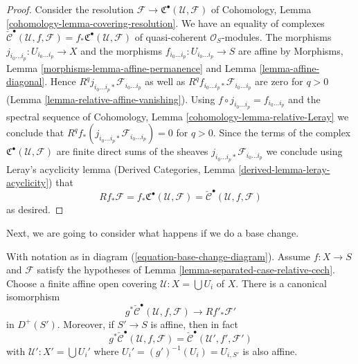 \begin{proof}
Consider the resolution
$\mathcal{F} \to {\mathfrak C}^\bullet(\mathcal{U}, \mathcal{F})$
of Cohomology, Lemma \ref{cohomology-lemma-covering-resolution}.
We have an equality of complexes
$\check{\mathcal{C}}^\bullet(\mathcal{U}, f, \mathcal{F}) =
f_*{\mathfrak C}^\bullet(\mathcal{U}, \mathcal{F})$
of quasi-coherent $\mathcal{O}_S$-modules.
The morphisms $j_{i_0 \ldots i_p} : U_{i_0 \ldots i_p} \to X$
and the morphisms $f_{i_0 \ldots i_p} : U_{i_0 \ldots i_p} \to S$
are affine by Morphisms, Lemma \ref{morphisms-lemma-affine-permanence}
and Lemma \ref{lemma-affine-diagonal}.
Hence $R^qj_{i_0 \ldots i_p *}\mathcal{F}_{i_0 \ldots i_p}$
as well as $R^qf_{i_0 \ldots i_p *}\mathcal{F}_{i_0 \ldots i_p}$
are zero for $q > 0$ (Lemma \ref{lemma-relative-affine-vanishing}).
Using $f \circ j_{i_0 \ldots i_p} = f_{i_0 \ldots i_p}$ and
the spectral sequence of
Cohomology, Lemma \ref{cohomology-lemma-relative-Leray}
we conclude that
$R^qf_*(j_{i_0 \ldots i_p *}\mathcal{F}_{i_0 \ldots i_p}) = 0$
for $q > 0$.
Since the terms of the complex
${\mathfrak C}^\bullet(\mathcal{U}, \mathcal{F})$ are finite direct
sums of the sheaves $j_{i_0 \ldots i_p *}\mathcal{F}_{i_0 \ldots i_p}$
we conclude using Leray's acyclicity lemma
(Derived Categories, Lemma \ref{derived-lemma-leray-acyclicity})
that
$$
Rf_* \mathcal{F} = f_*{\mathfrak C}^\bullet(\mathcal{U}, \mathcal{F}) =
\check{\mathcal{C}}^\bullet(\mathcal{U}, f, \mathcal{F})
$$
as desired.
\end{proof}

\noindent
Next, we are going to consider what happens if we do a base change.

\begin{lemma}
\label{lemma-base-change-complex}
With notation as in diagram (\ref{equation-base-change-diagram}).
Assume $f : X \to S$ and $\mathcal{F}$ satisfy the hypotheses of
Lemma \ref{lemma-separated-case-relative-cech}. Choose a finite
affine open covering $\mathcal{U} : X = \bigcup U_i$ of $X$.
There is a canonical isomorphism
$$
g^*\check{\mathcal{C}}^\bullet(\mathcal{U}, f, \mathcal{F})
\longrightarrow
Rf'_*\mathcal{F}'
$$
in $D^{+}(S')$. Moreover, if $S' \to S$ is affine, then in fact
$$
g^*\check{\mathcal{C}}^\bullet(\mathcal{U}, f, \mathcal{F})
=
\check{\mathcal{C}}^\bullet(\mathcal{U}', f', \mathcal{F}')
$$
with $\mathcal{U}' : X' = \bigcup U_i'$ where
$U_i' = (g')^{-1}(U_i) = U_{i, S'}$ is also affine.
\end{lemma}

